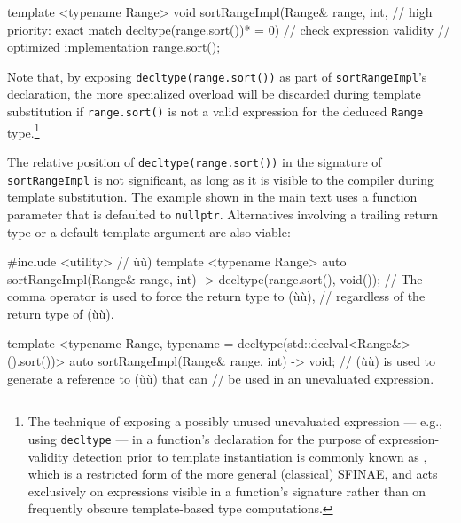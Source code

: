 \begin{emcppslisting}
template <typename Range>
void sortRangeImpl(Range& range,
                   int,                          // high priority: exact match
                   decltype(range.sort())* = 0)  // check expression validity
{
    // optimized implementation
    range.sort();
}
\end{emcppslisting}

\noindent Note that, by exposing \lstinline!decltype(range.sort())! as part of
\lstinline!sortRangeImpl!'s declaration, the more specialized overload will
be discarded during template substitution if \lstinline!range.sort()! is
not a valid expression for the deduced \lstinline!Range!
type.{\cprotect\footnote{The technique of exposing a possibly unused
unevaluated expression --- e.g., using \lstinline!decltype! --- in a function's
declaration for the purpose of expression-validity detection prior to
template instantiation is commonly known as ,
which is a restricted form of the more general (classical) SFINAE, and acts exclusively on
expressions visible in a function's signature rather than on frequently obscure
  template-based type computations.}}

The relative position of
\lstinline!decltype(range.sort())! in the signature of
\lstinline!sortRangeImpl! is not significant, as long as it is visible to
the compiler
during template substitution. The example shown in the main text uses a function parameter that is defaulted to
\lstinline!nullptr!. Alternatives involving a trailing return type or a
default template argument are also viable:

%
\begin{emcppslisting}
#include <utility>  // ù{}ù)
template <typename Range>
auto sortRangeImpl(Range& range, int) -> decltype(range.sort(), void());
    // The comma operator is used to force the return type to (ù{}ù),
    // regardless of the return type of (ù{}ù).

template <typename Range, typename = decltype(std::declval<Range&>().sort())>
auto sortRangeImpl(Range& range, int) -> void;
    // (ù{}ù) is used to generate a reference to (ù{}ù) that can
    // be used in an unevaluated expression.
\end{emcppslisting}

